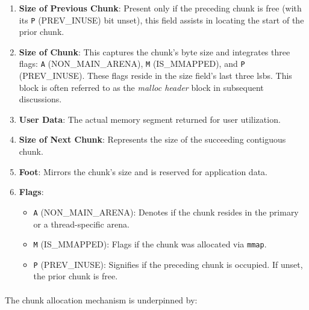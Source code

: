         \begin{enumerate}
            \item \textbf{Size of Previous Chunk}: Present only if the preceding chunk is free (with its \texttt{P} (PREV\_INUSE) bit unset), this field assists in locating the start of the prior chunk.
            
            \item \textbf{Size of Chunk}: This captures the chunk's byte size and integrates three flags: \texttt{A} (NON\_MAIN\_ARENA), \texttt{M} (IS\_MMAPPED), and \texttt{P} (PREV\_INUSE). These flags reside in the size field's last three \acrshort{lsb}s. This block is often referred to as the \textit{malloc header} block in subsequent discussions.
            
            \item \textbf{User Data}: The actual memory segment returned for user utilization.
            
            \item \textbf{Size of Next Chunk}: Represents the size of the succeeding contiguous chunk.
            
            \item \textbf{Foot}: Mirrors the chunk's size and is reserved for application data.
            
            \item \textbf{Flags}:
            \begin{itemize}
                \item \texttt{A} (NON\_MAIN\_ARENA): Denotes if the chunk resides in the primary or a thread-specific arena.
                \item \texttt{M} (IS\_MMAPPED): Flags if the chunk was allocated via \texttt{mmap}.
                \item \texttt{P} (PREV\_INUSE): Signifies if the preceding chunk is occupied. If unset, the prior chunk is free.
            \end{itemize}
        \end{enumerate}
        
        \paragraph{}The chunk allocation mechanism is underpinned by:
        
